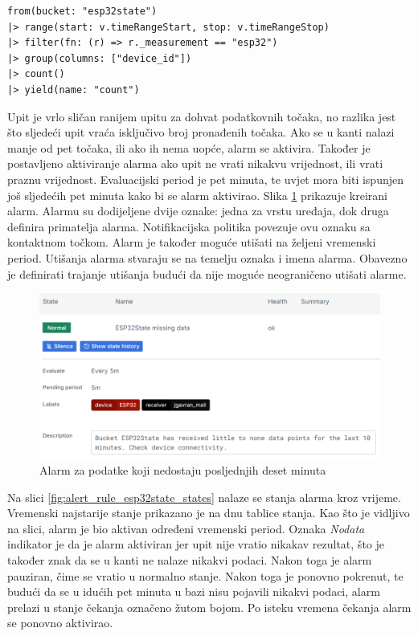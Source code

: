 \begin{lstlisting}[caption={Upit za alarm o nedostatku podataka}, language=flux]
from(bucket: "esp32state")
|> range(start: v.timeRangeStart, stop: v.timeRangeStop)
|> filter(fn: (r) => r._measurement == "esp32")
|> group(columns: ["device_id"])
|> count()
|> yield(name: "count")
\end{lstlisting}

Upit je vrlo sličan ranijem upitu za dohvat podatkovnih točaka, no razlika jest što sljedeći upit vraća isključivo broj pronađenih točaka. Ako se u kanti nalazi manje od pet točaka, ili ako ih nema uopće, alarm se aktivira. Također je postavljeno aktiviranje alarma ako upit ne vrati nikakvu vrijednost, ili vrati praznu vrijednost. Evaluacijski period je pet minuta, te uvjet mora biti ispunjen još sljedećih pet minuta kako bi se alarm aktivirao. Slika \ref{fig:alert_rule_esp32state} prikazuje kreirani alarm. Alarmu su dodijeljene dvije oznake: jedna za vrstu uređaja, dok druga definira primatelja alarma. Notifikacijska politika povezuje ovu oznaku sa kontaktnom točkom. Alarm je također moguće utišati na željeni vremenski period. Utišanja alarma  stvaraju se na temelju oznaka i imena alarma. Obavezno je definirati trajanje utišanja budući da nije moguće neograničeno utišati alarme. 

\begin{figure}[ht]
	\centering
	\includegraphics[scale=0.6]{imgs/alert_rule_esp32state}
	\caption{Alarm za podatke koji nedostaju posljednjih deset minuta}
	\label{fig:alert_rule_esp32state}
\end{figure}

Na slici \ref{fig:alert_rule_esp32state_states} nalaze se stanja alarma kroz vrijeme. Vremenski najstarije stanje prikazano je na dnu tablice stanja. Kao što je vidljivo na slici, alarm je bio aktivan određeni vremenski period. Oznaka \textit{Nodata} indikator je da je alarm aktiviran jer upit nije vratio nikakav rezultat, što je također znak da se u kanti ne nalaze nikakvi podaci. Nakon toga je alarm pauziran, čime se vratio u normalno stanje. Nakon toga je ponovno pokrenut, te budući da se u idućih pet minuta u bazi nisu pojavili nikakvi podaci, alarm prelazi u stanje čekanja označeno žutom bojom. Po isteku vremena čekanja alarm se ponovno aktivirao. 

